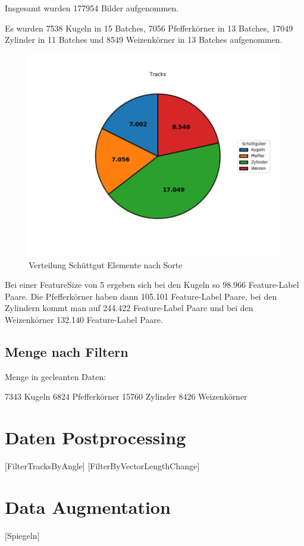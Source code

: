 Insgesamt wurden 177954 Bilder aufgenommen.

Es wurden 
7538 Kugeln in 15 Batches,
7056 Pfefferkörner in 13 Batches,
17049 Zylinder in 11 Batches
und 8549 Weizenkörner in 13 Batches aufgenommen.

\begin{figure}
    \centering
    \includegraphics[width=\textwidth]{img/scaledPieChart-trimmed}
    \caption{Verteilung Schüttgut Elemente nach Sorte}
    \label{piechartSchuettgut}
\end{figure}

Bei einer FeatureSize von 5 ergeben sich bei den Kugeln so 98.966 Feature-Label Paare.
Die Pfefferkörner haben dann 105.101 Feature-Label Paare,
bei den Zylindern kommt man auf 244.422 Feature-Label Paare
und bei den Weizenkörner 132.140 Feature-Label Paare.



\subsection{Menge nach Filtern}
Menge in gecleanten Daten:

7343 Kugeln
6824 Pfefferkörner
15760 Zylinder
8426 Weizenkörner


\section{Daten Postprocessing}

[FilterTracksByAngle] [FilterByVectorLengthChange]

\section{Data Augmentation}

[Spiegeln]